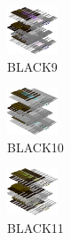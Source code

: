 \hspace{0.1cm}
\begin{minipage}[b]{0.15\linewidth}
\begin{figure}[H]                                                          
  \centering                                                             
  \begin{adjustbox}{width=1.5cm,center}                                   
  \includegraphics[width=1.5cm]{src/colorspace_colourflow/flows/colourflow_9-45.png}%
  \end{adjustbox}                                                        
\caption*{BLACK9}                                           
\end{figure}                                                               
\end{minipage}
\hspace{0.1cm}
\begin{minipage}[b]{0.15\linewidth}
\begin{figure}[H]                                                          
  \centering                                                             
  \begin{adjustbox}{width=1.5cm,center}                                   
  \includegraphics[width=1.5cm]{src/colorspace_colourflow/flows/colourflow_10-45.png}%
  \end{adjustbox}                                                        
\caption*{BLACK10}                                           
\end{figure}                                                               
\end{minipage}
\hspace{0.1cm}
\begin{minipage}[b]{0.15\linewidth}
\begin{figure}[H]                                                          
  \centering                                                             
  \begin{adjustbox}{width=1.5cm,center}                                   
  \includegraphics[width=1.5cm]{src/colorspace_colourflow/flows/colourflow_11-45.png}%
  \end{adjustbox}                                                        
\caption*{BLACK11}                                           
\end{figure}                                                               
\end{minipage}
